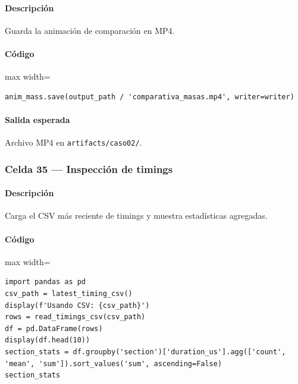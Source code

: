 \paragraph{Descripción} Guarda la animación de comparación en MP4.
\paragraph{Código}
\begin{listing}[H]
\caption{Celda 33: exportación de \texttt{comparativa\_masas.mp4}}
\begin{adjustbox}{max width=\textwidth}
\begin{minipage}{\textwidth}
\begin{verbatim}
anim_mass.save(output_path / 'comparativa_masas.mp4', writer=writer)
\end{verbatim}
\end{minipage}
\end{adjustbox}
\end{listing}
\paragraph{Salida esperada} Archivo MP4 en \texttt{artifacts/caso02/}.

\subsubsection*{Celda 35 — Inspección de timings}
\paragraph{Descripción} Carga el CSV más reciente de timings y muestra estadísticas agregadas.
\paragraph{Código}
\begin{listing}[H]
\caption{Celda 35: inspección del CSV de timings}
\begin{adjustbox}{max width=\textwidth}
\begin{minipage}{\textwidth}
\begin{verbatim}
import pandas as pd
csv_path = latest_timing_csv()
display(f'Usando CSV: {csv_path}')
rows = read_timings_csv(csv_path)
df = pd.DataFrame(rows)
display(df.head(10))
section_stats = df.groupby('section')['duration_us'].agg(['count', 'mean', 'sum']).sort_values('sum', ascending=False)
section_stats
\end{verbatim}
\end{minipage}
\end{adjustbox}
\end{listing}
